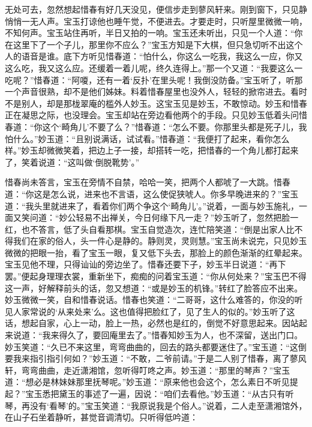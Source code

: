 \begin{parag}
    无处可去，忽然想起惜春有好几天没见，便信步走到蓼风轩来。刚到窗下，只见静悄悄一无人声。宝玉打谅他也睡午觉，不便进去。才要走时，只听屋里微微一响，不知何声。宝玉站住再听，半日又拍的一响。宝玉还未听出，只见一个人道：“你在这里下了一个子儿，那里你不应么？”宝玉方知是下大棋，但只急切听不出这个人的语音是谁。底下方听见惜春道：“怕什么，你这么一吃我，我这么一应，你又这么吃，我又这么应。还缓着一着儿呢，终久连得上。”那一个又道：“我要这么一吃呢？”惜春道：“阿嗄，还有一着‘反扑’在里头呢！我倒没防备。”宝玉听了，听那一个声音很熟，却不是他们姊妹。料着惜春屋里也没外人，轻轻的掀帘进去。看时不是别人，却是那栊翠庵的槛外人妙玉。这宝玉见是妙玉，不敢惊动。妙玉和惜春正在凝思之际，也没理会。宝玉却站在旁边看他两个的手段。只见妙玉低着头问惜春道：“你这个‘畸角儿’不要了么？”惜春道：“怎么不要。你那里头都是死子儿，我怕什么。”妙玉道：“且别说满话，试试看。”惜春道：“我便打了起来，看你怎么样。”妙玉却微微笑着，把边上子一接，却搭转一吃，把惜春的一个角儿都打起来了，笑着说道：“这叫做‘倒脱靴势’。”
\end{parag}


\begin{parag}
    惜春尚未答言，宝玉在旁情不自禁，哈哈一笑，把两个人都唬了一大跳。惜春道：“你这是怎么说，进来也不言语，这么使促狭唬人。你多早晚进来的？”宝玉道：“我头里就进来了，看着你们两个争这个‘畸角儿’。”说着，一面与妙玉施礼，一面又笑问道：“妙公轻易不出禅关，今日何缘下凡一走？”妙玉听了，忽然把脸一红，也不答言，低了头自看那棋。宝玉自觉造次，连忙陪笑道：“倒是出家人比不得我们在家的俗人，头一件心是静的。静则灵，灵则慧。”宝玉尚未说完，只见妙玉微微的把眼一抬，看了宝玉一眼，复又低下头去，那脸上的颜色渐渐的红晕起来。宝玉见他不理，只得讪讪的旁边坐了。惜春还要下子，妙玉半日说道：“再下罢。”便起身理理衣裳，重新坐下，痴痴的问着宝玉道：“你从何处来？”宝玉巴不得这一声，好解释前头的话，忽又想道：“或是妙玉的机锋。”转红了脸答应不出来。妙玉微微一笑，自和惜春说话。惜春也笑道：“二哥哥，这什么难答的，你没的听见人家常说的‘从来处来’么。这也值得把脸红了，见了生人的似的。”妙玉听了这话，想起自家，心上一动，脸上一热，必然也是红的，倒觉不好意思起来。因站起来说道：“我来得久了，要回庵里去了。”惜春知妙玉为人，也不深留，送出门口。妙玉笑道：“久已不来这里，弯弯曲曲的，回去的路头都要迷住了。”宝玉道：“这倒要我来指引指引何如？”妙玉道：“不敢，二爷前请。”于是二人别了惜春，离了蓼风轩，弯弯曲曲，走近潇湘馆，忽听得叮咚之声。妙玉道：“那里的琴声？”宝玉道：“想必是林妹妹那里抚琴呢。”妙玉道：“原来他也会这个，怎么素日不听见提起？”宝玉悉把黛玉的事述了一遍，因说：“咱们去看他。”妙玉道：“从古只有听琴，再没有‘看琴’的。”宝玉笑道：“我原说我是个俗人。”说着，二人走至潇湘馆外，在山子石坐着静听，甚觉音调清切。只听得低吟道：
\end{parag}


